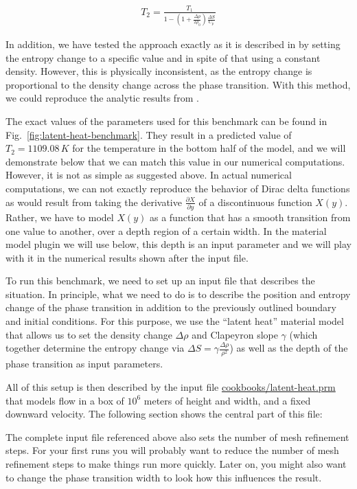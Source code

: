 \documentclass{article}
\begin{document}
\begin{gather*}
T_2 = \frac{T_1}{1 - (1+\frac{\Delta \rho}{2 \rho_0}) \frac{\Delta S}{C_p}}
\end{gather*}

In addition, we have tested the approach exactly as it is described in \cite{STO01} by setting the entropy change to a specific value and in spite of that using a constant density. However, this is physically inconsistent, as the entropy change is proportional to the density change across the phase transition. With this method, we could reproduce the analytic results from \cite{STO01}.

The exact values of the parameters used for this benchmark can be found in
Fig.~\ref{fig:latent-heat-benchmark}. They result in a predicted value of $T_2 =
1109.08 \, \si{K}$ for the temperature in the bottom half of the model, and
we will demonstrate below that we can match this value in our numerical
computations. However, it is not as simple as suggested above. In actual
numerical computations, we can not exactly reproduce the behavior of Dirac delta
functions as would result from taking the derivative $\frac{\partial
X}{\partial y}$ of a discontinuous function $X(y)$. Rather, we have to model
$X(y)$ as a function that has a smooth transition from one value to another,
over a depth region of a certain width. In the material model plugin we will use
below, this depth is an input parameter and we will play with it in the
numerical results shown after the input file.

To run this benchmark, we need to set up an input file that describes the
situation. In principle, what we need to do is to describe the position and
entropy change of the phase transition in addition to the previously outlined
boundary and initial conditions. For this purpose, we use the ``latent heat''
material model that allows us to set the density change $\Delta\rho$ and
Clapeyron slope $\gamma$ (which together determine the entropy change via
$\Delta S = \gamma \frac{\Delta\rho}{\rho^2}$) as well as the depth of the phase
transition as input parameters.

All of this setup is then described by the input file
\url{cookbooks/latent-heat.prm} that models flow in a box of $10^6$ meters of
height and width, and a fixed downward velocity. The following section shows the
central part of this file:



The complete input file referenced above also sets the number of mesh refinement
steps. For your first runs you will probably want to reduce the number of mesh
refinement steps to make things run more quickly. Later on, you might also want
to change the phase transition width to look how this influences the result.
\end{document}
